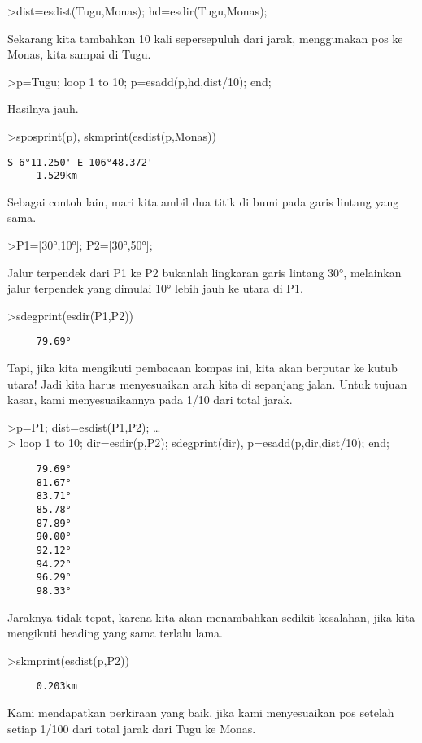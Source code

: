 \documentclass[
]{book}
\begin{document}
\textgreater dist=esdist(Tugu,Monas); hd=esdir(Tugu,Monas);

Sekarang kita tambahkan 10 kali sepersepuluh dari jarak, menggunakan pos ke Monas, kita sampai di Tugu.

\textgreater p=Tugu; loop 1 to 10; p=esadd(p,hd,dist/10); end;

Hasilnya jauh.

\textgreater sposprint(p), skmprint(esdist(p,Monas))

\begin{verbatim}
S 6°11.250' E 106°48.372'
     1.529km
\end{verbatim}

Sebagai contoh lain, mari kita ambil dua titik di bumi pada garis lintang yang sama.

\textgreater P1={[}30°,10°{]}; P2={[}30°,50°{]};

Jalur terpendek dari P1 ke P2 bukanlah lingkaran garis lintang 30°, melainkan jalur terpendek yang dimulai 10° lebih jauh ke utara di P1.

\textgreater sdegprint(esdir(P1,P2))

\begin{verbatim}
     79.69°
\end{verbatim}

Tapi, jika kita mengikuti pembacaan kompas ini, kita akan berputar ke kutub utara! Jadi kita harus menyesuaikan arah kita di sepanjang jalan. Untuk tujuan kasar, kami menyesuaikannya pada 1/10 dari total jarak.

\textgreater p=P1; dist=esdist(P1,P2); \ldots{}\\
\textgreater{} loop 1 to 10; dir=esdir(p,P2); sdegprint(dir), p=esadd(p,dir,dist/10); end;

\begin{verbatim}
     79.69°
     81.67°
     83.71°
     85.78°
     87.89°
     90.00°
     92.12°
     94.22°
     96.29°
     98.33°
\end{verbatim}

Jaraknya tidak tepat, karena kita akan menambahkan sedikit kesalahan, jika kita mengikuti heading yang sama terlalu lama.

\textgreater skmprint(esdist(p,P2))

\begin{verbatim}
     0.203km
\end{verbatim}

Kami mendapatkan perkiraan yang baik, jika kami menyesuaikan pos setelah setiap 1/100 dari total jarak dari Tugu ke Monas.
\end{document}
